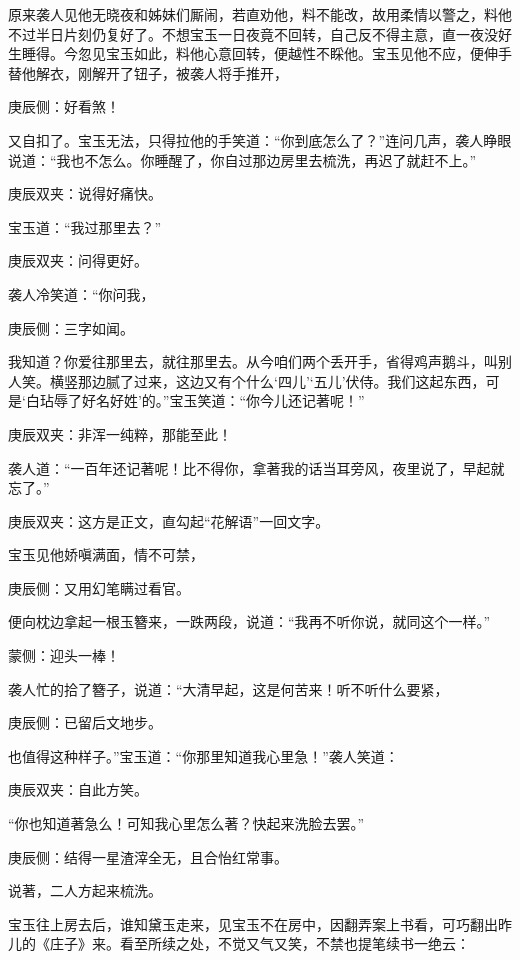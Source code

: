 \begin{parag}
    原来袭人见他无晓夜和姊妹们厮闹，若直劝他，料不能改，故用柔情以警之，料他不过半日片刻仍复好了。不想宝玉一日夜竟不回转，自己反不得主意，直一夜没好生睡得。今忽见宝玉如此，料他心意回转，便越性不睬他。宝玉见他不应，便伸手替他解衣，刚解开了钮子，被袭人将手推开，\begin{note}庚辰侧：好看煞！\end{note}又自扣了。宝玉无法，只得拉他的手笑道：“你到底怎么了？”连问几声，袭人睁眼说道：“我也不怎么。你睡醒了，你自过那边房里去梳洗，再迟了就赶不上。”\begin{note}庚辰双夹：说得好痛快。\end{note}宝玉道：“我过那里去？”\begin{note}庚辰双夹：问得更好。\end{note}袭人冷笑道：“你问我，\begin{note}庚辰侧：三字如闻。\end{note}我知道？你爱往那里去，就往那里去。从今咱们两个丢开手，省得鸡声鹅斗，叫别人笑。横竖那边腻了过来，这边又有个什么‘四儿’‘五儿’伏侍。我们这起东西，可是‘白玷辱了好名好姓’的。”宝玉笑道：“你今儿还记著呢！”\begin{note}庚辰双夹：非浑一纯粹，那能至此！\end{note}袭人道：“一百年还记著呢！比不得你，拿著我的话当耳旁风，夜里说了，早起就忘了。”\begin{note}庚辰双夹：这方是正文，直勾起“花解语”一回文字。\end{note}宝玉见他娇嗔满面，情不可禁，\begin{note}庚辰侧：又用幻笔瞒过看官。\end{note}便向枕边拿起一根玉簪来，一跌两段，说道：“我再不听你说，就同这个一样。”\begin{note}蒙侧：迎头一棒！\end{note}袭人忙的拾了簪子，说道：“大清早起，这是何苦来！听不听什么要紧，\begin{note}庚辰侧：已留后文地步。\end{note}也值得这种样子。”宝玉道：“你那里知道我心里急！”袭人笑道：\begin{note}庚辰双夹：自此方笑。\end{note}“你也知道著急么！可知我心里怎么著？快起来洗脸去罢。”\begin{note}庚辰侧：结得一星渣滓全无，且合怡红常事。\end{note}说著，二人方起来梳洗。
\end{parag}


\begin{parag}
    宝玉往上房去后，谁知黛玉走来，见宝玉不在房中，因翻弄案上书看，可巧翻出昨儿的《庄子》来。看至所续之处，不觉又气又笑，不禁也提笔续书一绝云：
\end{parag}


